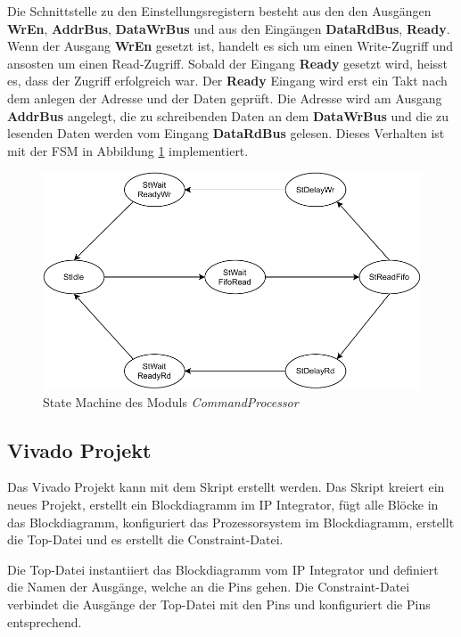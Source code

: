 \documentclass{article}
\begin{document}
Die Schnittstelle zu den Einstellungsregistern besteht aus den den Ausgängen \textbf{WrEn}, \textbf{AddrBus}, \textbf{DataWrBus} und aus den Eingängen \textbf{DataRdBus}, \textbf{Ready}.
Wenn der Ausgang \textbf{WrEn} gesetzt ist, handelt es sich um einen Write-Zugriff und ansosten um einen Read-Zugriff. Sobald der Eingang \textbf{Ready} gesetzt wird, heisst es, dass der Zugriff erfolgreich war. Der \textbf{Ready} Eingang wird erst ein Takt nach dem anlegen der Adresse und der Daten geprüft. Die Adresse wird am Ausgang \textbf{AddrBus} angelegt, die zu schreibenden Daten an dem \textbf{DataWrBus} und die zu lesenden Daten werden vom Eingang \textbf{DataRdBus} gelesen. Dieses Verhalten ist mit der FSM in Abbildung \ref{fig:fsm_command_processor} implementiert.

\begin{figure}[tb]
    \includegraphics[width=\linewidth]{drawio/fsm_command_processor}
    \caption{State Machine des Moduls \textit{CommandProcessor}}
    \label{fig:fsm_command_processor}
\end{figure}

\subsection{Vivado Projekt}
Das Vivado Projekt kann mit dem Skript erstellt werden. Das Skript kreiert ein neues Projekt, erstellt ein Blockdiagramm im IP Integrator, fügt alle Blöcke in das Blockdiagramm, konfiguriert das Prozessorsystem im Blockdiagramm, erstellt die Top-Datei und es erstellt die Constraint-Datei.

Die Top-Datei instantiiert das Blockdiagramm vom IP Integrator und definiert die Namen der Ausgänge, welche an die Pins gehen. Die Constraint-Datei verbindet die Ausgänge der Top-Datei mit den Pins und konfiguriert die Pins entsprechend. 
\end{document}
